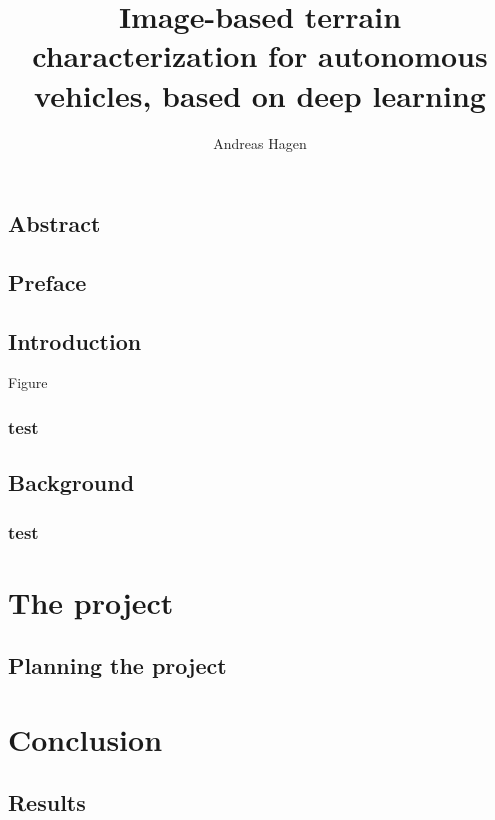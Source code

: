 \documentclass[UKenglish]{ifimaster}  %
\title{Image-based terrain characterization for autonomous vehicles, based on deep learning}        %
\author{Andreas Hagen}                      %
\begin{document}
\duoforside[dept={Department of Technology Systems},   %
  program={Cybernetics},  %
  short]                                        %

\frontmatter{}
\chapter*{Abstract}                   %

\tableofcontents{}
\listoffigures{}
\listoftables{}

\chapter*{Preface}                    %

\mainmatter{}
\chapter{Introduction}                   %
Figure\cite{HanDerreToby}
\section{test}

\chapter{Background}                  %
\section{test}



\part{The project}                    %


\chapter{Planning the project}        %



\part{Conclusion}                     %


\chapter{Results}                     %



\backmatter{}
\printbibliography
\end{document}
